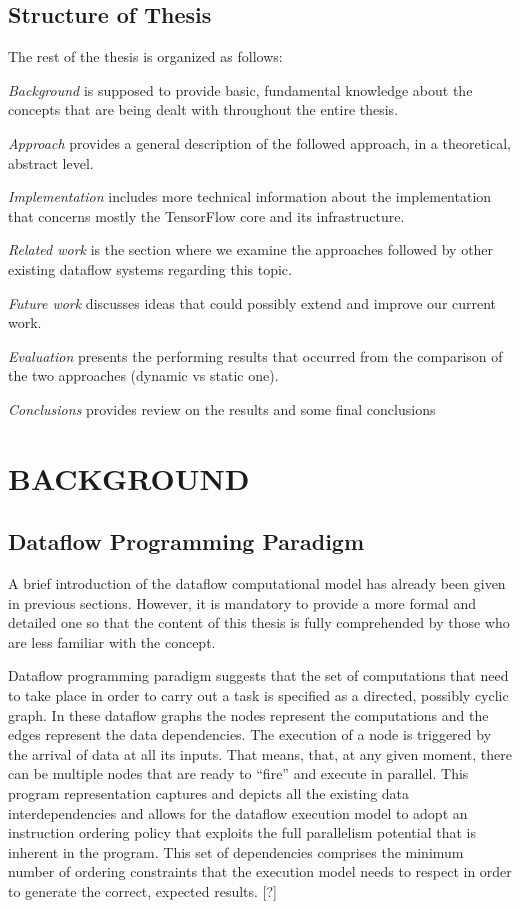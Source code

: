 \documentclass[ack,preface]{dithesis}
\begin{document}
    \section{Structure of Thesis}
The rest of the thesis is organized as follows:

\textit{Background} is supposed to provide basic, fundamental knowledge about the concepts that are being dealt with throughout the entire thesis.

\textit{Approach} provides a general description of the followed approach, in a theoretical, abstract level.

\textit{Implementation} includes more technical information about the implementation that concerns mostly the TensorFlow core and its infrastructure.

\textit{Related work} is the section where we examine the approaches followed by other existing dataflow systems regarding this topic.

\textit{Future work} discusses ideas that could possibly extend and improve our current work.

\textit{Evaluation} presents the performing results that occurred from the comparison of the two approaches (dynamic vs static one).

\textit{Conclusions} provides review on the results and some final conclusions


\chapter{BACKGROUND}
    \section{Dataflow Programming Paradigm}
A brief introduction of the dataflow computational model has already been given in previous sections. However, it is mandatory to provide a more formal and detailed one so that the content of this thesis is fully comprehended by those who are less familiar with the concept.

Dataflow programming paradigm suggests that the set of computations that need to take place in order to carry out a task is specified as a directed, possibly cyclic graph. In these dataflow graphs the nodes represent the computations and the edges represent the data dependencies. The execution of a node is triggered by the arrival of data at all its inputs. That means, that, at any given moment, there can be multiple nodes that are ready to “fire” and execute in parallel. This program representation captures and depicts all the existing data interdependencies and allows for the dataflow execution model to adopt an instruction ordering policy that exploits the full parallelism potential that is inherent in the program. This set of dependencies comprises the minimum number of ordering constraints that the execution model needs to respect in order to generate the correct, expected results. [?]
\end{document}
